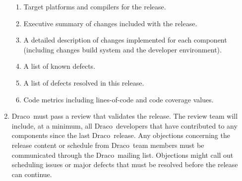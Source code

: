 \documentclass[note]{ResearchNote_pdf}
\newcommand{\draco}{{\normalfont\small\sffamily Draco}}
\begin{document}
\begin{enumerate}
\begin{enumerate}
    \item Target platforms and compilers for the release.
    \item Executive summary of changes included with the release.
    \item A detailed description of changes implemented for each
      component (including changes build system and the developer
      environment). 
    \item A list of known defects.
    \item A list of defects resolved in this release.
    \item Code metrics including lines-of-code and code coverage
      values.
  \end{enumerate}

\item \draco\ must pass a review that validates the release.  The
  review team will include, at a minimum, all \draco\ developers that
  have contributed to any components since the last \draco\ release.
  Any objections concerning the release content or schedule from
  \draco\ team members must be communicated through the
  \draco\ mailing list.  Objections might call out scheduling issues
  or major defects that must be resolved before the release can
  continue.


\end{enumerate}
\end{document}
